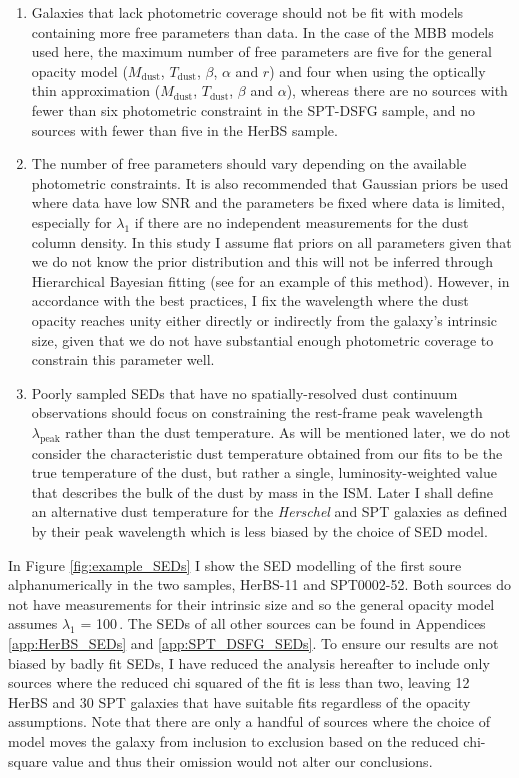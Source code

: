 \begin{enumerate}
	\item Galaxies that lack photometric coverage should not be fit with models containing more free parameters than data. In the case of the MBB models used here, the maximum number of free parameters are five for the general opacity model ($M_{\textrm{dust}}$, $T_{\textrm{dust}}$, $\beta$, $\alpha$ and $r$) and four when using the optically thin approximation ($M_{\textrm{dust}}$, $T_{\textrm{dust}}$, $\beta$ and $\alpha$), whereas there are no sources with fewer than six photometric constraint in the SPT-DSFG sample, and no sources with fewer than five in the HerBS sample.
	\item The number of free parameters should vary depending on the available photometric constraints. It is also recommended that Gaussian priors be used where data have low SNR and the parameters be fixed where data is limited, especially for $\lambda_1$ if there are no independent measurements for the dust column density. In this study I assume flat priors on all parameters given that we do not know the prior distribution and this will not be inferred through Hierarchical Bayesian fitting (see \citealt{Lamperti_2019} for an example of this method). However, in accordance with the best practices, I fix the wavelength where the dust opacity reaches unity either directly or indirectly from the galaxy's intrinsic size, given that we do not have substantial enough photometric coverage to constrain this parameter well.
	\item Poorly sampled SEDs that have no spatially-resolved dust continuum observations should focus on constraining the rest-frame peak wavelength $\lambda_{\textrm{peak}}$ rather than the dust temperature. As will be mentioned later, we do not consider the characteristic dust temperature obtained from our fits to be the true temperature of the dust, but rather a single, luminosity-weighted value that describes the bulk of the dust by mass in the ISM. Later I shall define an alternative dust temperature for the \textit{Herschel} and SPT galaxies as defined by their peak wavelength which is less biased by the choice of SED model.
\end{enumerate}

In Figure \ref{fig:example_SEDs} I show the SED modelling of the first soure alphanumerically in the two samples, HerBS-11 and SPT0002-52. Both sources do not have measurements for their intrinsic size and so the general opacity model assumes $\lambda_1$ = 100\,\micron. The SEDs of all other sources can be found in Appendices \ref{app:HerBS_SEDs} and \ref{app:SPT_DSFG_SEDs}. To ensure our results are not biased by badly fit SEDs, I have reduced the analysis hereafter to include only sources where the reduced chi squared of the fit is less than two, leaving 12 HerBS and 30 SPT galaxies that have suitable fits regardless of the opacity assumptions. Note that there are only a handful of sources where the choice of model moves the galaxy from inclusion to exclusion based on the reduced chi-square value and thus their omission would not alter our conclusions.

